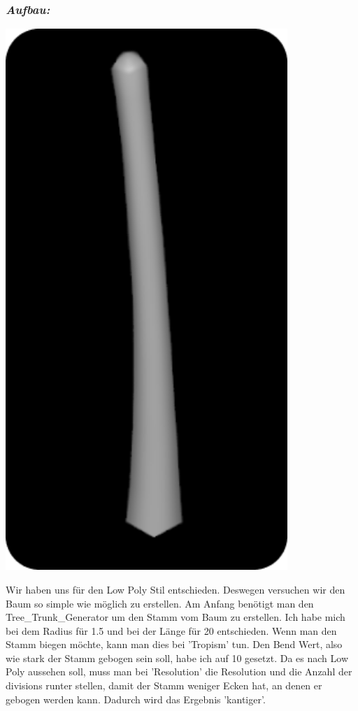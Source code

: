 \documentclass[paper=a4,fontsize=12pt,ngerman]{scrartcl}
\begin{document}
	\subsubsection*{\textit{Aufbau:}} 
	\begin{minipage}{0.3\textwidth}
		\includegraphics[width=0.8\textwidth]{graphics/Ali3.png}
	\end{minipage}
	\begin{minipage}{0.7\textwidth}
	Wir haben uns für den Low Poly Stil entschieden. Deswegen versuchen wir den Baum so simple wie möglich zu erstellen. Am Anfang benötigt man den Tree\_Trunk\_Generator um den Stamm vom Baum zu erstellen. Ich habe mich bei dem Radius für 1.5 und bei der Länge für 20 entschieden. Wenn man den Stamm biegen möchte, kann man dies bei 'Tropism' tun. Den Bend Wert, also wie stark der Stamm gebogen sein soll, habe ich auf 10 gesetzt.  Da es nach Low Poly aussehen soll, muss man bei 'Resolution' die Resolution und die Anzahl der divisions runter stellen, damit der Stamm weniger Ecken hat, an denen er gebogen werden kann. Dadurch wird das Ergebnis 'kantiger'.
	\end{minipage}\\ \\
\end{document}
